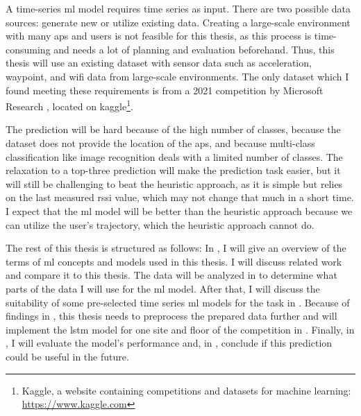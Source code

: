 A time-series \ac{ml} model requires time series  as input.
There are two possible data sources: generate new or utilize existing data. 
Creating a large-scale environment with many \acp{ap} and users is not feasible for this thesis, as this process is time-consuming and needs a lot of planning and evaluation beforehand.
Thus, this thesis will use an existing dataset with sensor data such as acceleration, waypoint, and \ac{wifi} data from large-scale environments.
The only dataset which I found meeting these requirements is from a 2021 competition by Microsoft Research \cite{IndoorLocationNavigation}, located on kaggle\footnote{Kaggle, a website containing competitions and datasets for machine learning: \url{https://www.kaggle.com}}.

The prediction will be hard because of the high number of classes, because the dataset does not provide the location of the \acp{ap}, and because  multi-class classification like image recognition deals with a limited number of classes.
The relaxation to a top-three prediction will make the prediction task easier, but it will still be challenging to beat the heuristic approach, as it is simple but relies on the last measured \ac{rssi} value, which may not change that much in a short time. 
I expect that the \ac{ml} model will be better than the heuristic approach because we can utilize the user's trajectory, which the heuristic approach cannot do.

The rest of this thesis is structured as follows:
In , I will give an overview of the terms of \ac{ml} concepts and models used in this thesis.
 I will discuss related work and compare it to this thesis.
The data will be analyzed in  to determine what parts of the data I will use for the \ac{ml} model.
After that, I will discuss the suitability of some pre-selected time series \ac{ml} models for the task in . 
Because of findings in , this thesis needs to preprocess the prepared data further and will implement the \ac{lstm} model for one site and floor of the competition in .
Finally, in , I will evaluate the model's performance and, in , conclude if this prediction could be useful in the future.
